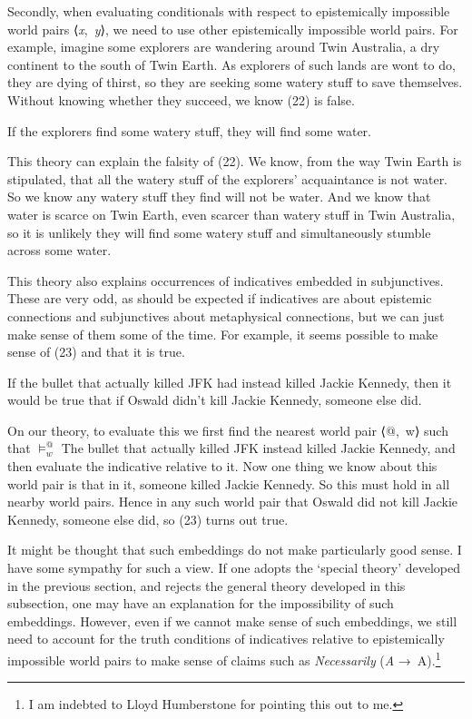 \documentclass[
  11pt,
  letterpaper,
  DIV=11,
  numbers=noendperiod,
  twoside]{scrartcl}
\providecommand{\tightlist}{%
  \setlength{\itemsep}{0pt}\setlength{\parskip}{0pt}}\usepackage{longtable,booktabs,array}
\begin{document}
Secondly, when evaluating conditionals with respect to epistemically
impossible world pairs ⟨\emph{x},~\emph{y}⟩, we need to use other
epistemically impossible world pairs. For example, imagine some
explorers are wandering around Twin Australia, a dry continent to the
south of Twin Earth. As explorers of such lands are wont to do, they are
dying of thirst, so they are seeking some watery stuff to save
themselves. Without knowing whether they succeed, we know (22) is false.

\begin{description}
\tightlist
\item[(22)]
If the explorers find some watery stuff, they will find some water.
\end{description}

This theory can explain the falsity of (22). We know, from the way Twin
Earth is stipulated, that all the watery stuff of the explorers'
acquaintance is not water. So we know any watery stuff they find will
not be water. And we know that water is scarce on Twin Earth, even
scarcer than watery stuff in Twin Australia, so it is unlikely they will
find some watery stuff and simultaneously stumble across some water.

This theory also explains occurrences of indicatives embedded in
subjunctives. These are very odd, as should be expected if indicatives
are about epistemic connections and subjunctives about metaphysical
connections, but we can just make sense of them some of the time. For
example, it seems possible to make sense of (23) and that it is true.

\begin{description}
\tightlist
\item[(23)]
If the bullet that actually killed JFK had instead killed Jackie
Kennedy, then it would be true that if Oswald didn't kill Jackie
Kennedy, someone else did.
\end{description}

On our theory, to evaluate this we first find the nearest world pair
⟨@,~w⟩ such that \(\vDash_w^@\) The bullet that actually killed JFK
instead killed Jackie Kennedy, and then evaluate the indicative relative
to it. Now one thing we know about this world pair is that in it,
someone killed Jackie Kennedy. So this must hold in all nearby world
pairs. Hence in any such world pair that Oswald did not kill Jackie
Kennedy, someone else did, so (23) turns out true.

It might be thought that such embeddings do not make particularly good
sense. I have some sympathy for such a view. If one adopts the `special
theory' developed in the previous section, and rejects the general
theory developed in this subsection, one may have an explanation for the
impossibility of such embeddings. However, even if we cannot make sense
of such embeddings, we still need to account for the truth conditions of
indicatives relative to epistemically impossible world pairs to make
sense of claims such as \emph{Necessarily} (\emph{A} →~A).\footnote{I am
  indebted to Lloyd Humberstone for pointing this out to me.}
\end{document}
